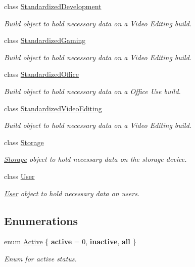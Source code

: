 \begin{DoxyCompactItemize}
class \hyperlink{class_business_objects_1_1_standardized_development}{Standardized\+Development}
\begin{DoxyCompactList}\small\item\em Build object to hold necessary data on a Video Editing build. \end{DoxyCompactList}\item 
class \hyperlink{class_business_objects_1_1_standardized_gaming}{Standardized\+Gaming}
\begin{DoxyCompactList}\small\item\em Build object to hold necessary data on a Video Editing build. \end{DoxyCompactList}\item 
class \hyperlink{class_business_objects_1_1_standardized_office}{Standardized\+Office}
\begin{DoxyCompactList}\small\item\em Build object to hold necessary data on a Office Use build. \end{DoxyCompactList}\item 
class \hyperlink{class_business_objects_1_1_standardized_video_editing}{Standardized\+Video\+Editing}
\begin{DoxyCompactList}\small\item\em Build object to hold necessary data on a Video Editing build. \end{DoxyCompactList}\item 
class \hyperlink{class_business_objects_1_1_storage}{Storage}
\begin{DoxyCompactList}\small\item\em \hyperlink{class_business_objects_1_1_storage}{Storage} object to hold necessary data on the storage device. \end{DoxyCompactList}\item 
class \hyperlink{class_business_objects_1_1_user}{User}
\begin{DoxyCompactList}\small\item\em \hyperlink{class_business_objects_1_1_user}{User} object to hold necessary data on users. \end{DoxyCompactList}\end{DoxyCompactItemize}
\subsection*{Enumerations}
\begin{DoxyCompactItemize}
\item 
enum \hyperlink{namespace_business_objects_a640a4d136931381578aad0a180173cfc}{Active} \{ {\bfseries active} = 0, 
{\bfseries inactive}, 
{\bfseries all}
 \}\begin{DoxyCompactList}\small\item\em Enum for active status. \end{DoxyCompactList}
\end{DoxyCompactItemize}


